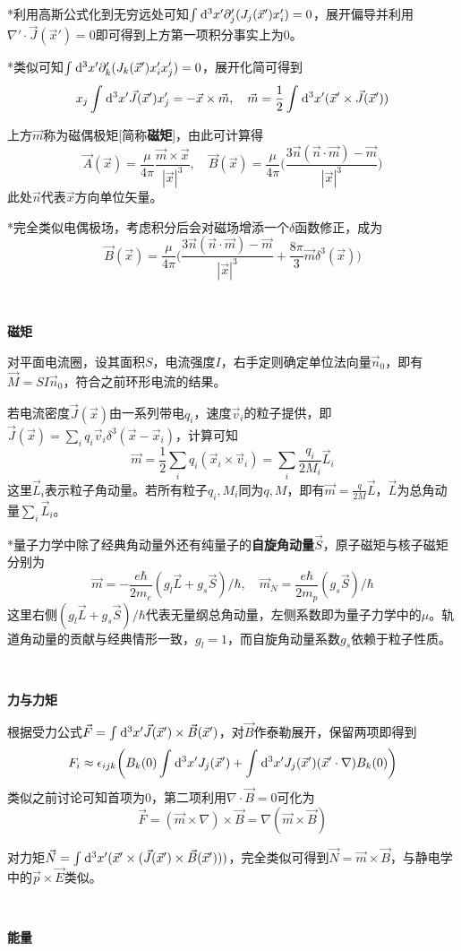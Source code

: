\documentclass[a4paper,UTF8,fontset=windows]{ctexart}
\newcommand*{\dr}{\hspace{0.07em}\mathrm{d}}
\newcommand*{\va}{\vec{A}}
\newcommand*{\vb}{\vec{B}}
\newcommand*{\ve}{\vec{E}}
\newcommand*{\vf}{\vec{F}}
\newcommand*{\vj}{\vec{J}}
\newcommand*{\vl}{\vec{L}}
\newcommand*{\vm}{\vec{M}}
\newcommand*{\vn}{\vec{N}}
\newcommand*{\vs}{\vec{S}}
\newcommand*{\vms}{\vec{m}}
\newcommand*{\vns}{\vec{n}}
\newcommand*{\vps}{\vec{p}}
\newcommand*{\vvs}{\vec{v}}
\newcommand*{\vx}{\vec{x}}
\begin{document}
*利用高斯公式化到无穷远处可知$\int\dr^3x'\partial_j'(J_j(\vx')x_i')=0$，展开偏导并利用$\nabla'\cdot\vj(\vx')=0$即可得到上方第一项积分事实上为0。

*类似可知$\int\dr^3x'\partial_k'(J_k(\vx')x_i'x_j')=0$，展开化简可得到
$$x_j\int\dr^3x'\vj(\vx')x_j'=-\vx\times\vms,\quad\vms=\frac{1}{2}\int\dr^3x'(\vx'\times\vj(\vx'))$$

上方$\vms$称为磁偶极矩[简称\textbf{磁矩}]，由此可计算得
$$\va(\vx)=\frac{\mu}{4\pi}\frac{\vms\times\vx}{|\vx|^3},\quad\vb(\vx)=\frac{\mu}{4\pi}\bigg(\frac{3\vns(\vns\cdot\vms)-\vms}{|\vx|^3}\bigg)$$
此处$\vns$代表$\vx$方向单位矢量。

*完全类似电偶极场，考虑积分后会对磁场增添一个$\delta$函数修正，成为
$$\vb(\vx)=\frac{\mu}{4\pi}\bigg(\frac{3\vns(\vns\cdot\vms)-\vms}{|\vx|^3}+\frac{8\pi}{3}\vms\delta^3(\vx)\bigg)$$

\

\textbf{磁矩}

对平面电流圈，设其面积$S$，电流强度$I$，右手定则确定单位法向量$\vns_0$，即有$\vm=SI\vns_0$，符合之前环形电流的结果。

若电流密度$\vj(\vx)$由一系列带电$q_i$，速度$\vvs_i$的粒子提供，即$\vj(\vx)=\sum_iq_i\vvs_i\delta^3(\vx-\vx_i)$，计算可知
$$\vms=\frac{1}{2}\sum_iq_i(\vx_i\times\vvs_i)=\sum_i\frac{q_i}{2M_i}\vl_i$$
这里$\vl_i$表示粒子角动量。若所有粒子$q_i,M_i$同为$q,M$，即有$\vms=\frac{q}{2M}\vl$，$\vl$为总角动量$\sum_i\vl_i$。

*量子力学中除了经典角动量外还有纯量子的\textbf{自旋角动量}$\vs$，原子磁矩与核子磁矩分别为
$$\vms=-\frac{e\hbar}{2m_e}(g_l\vl+g_s\vs)/\hbar,\quad\vms_N=\frac{e\hbar}{2m_p}(g_s\vs)/\hbar$$
这里右侧$(g_l\vl+g_s\vs)/\hbar$代表无量纲总角动量，左侧系数即为量子力学中的$\mu$。轨道角动量的贡献与经典情形一致，$g_l=1$，而自旋角动量系数$g_s$依赖于粒子性质。

\

\textbf{力与力矩}

根据受力公式$\vf=\int\dr^3x'\vj(\vx')\times\vb(\vx')$，对$\vb$作泰勒展开，保留两项即得到
$$F_i\approx\epsilon_{ijk}\bigg(B_k(0)\int\dr^3x'J_j(\vx')+\int\dr^3x'J_j(\vx')(\vx'\cdot\nabla)B_k(0)\bigg)$$
类似之前讨论可知首项为0，第二项利用$\nabla\cdot\vb=0$可化为
$$\vf=(\vms\times\nabla)\times\vb=\nabla(\vms\times\vb)$$

对力矩$\vn=\int\dr^3x'(\vx'\times(\vj(\vx')\times\vb(\vx')))$，完全类似可得到$\vn=\vms\times\vb$，与静电学中的$\vps\times\ve$类似。

\

\textbf{能量}
\end{document}
